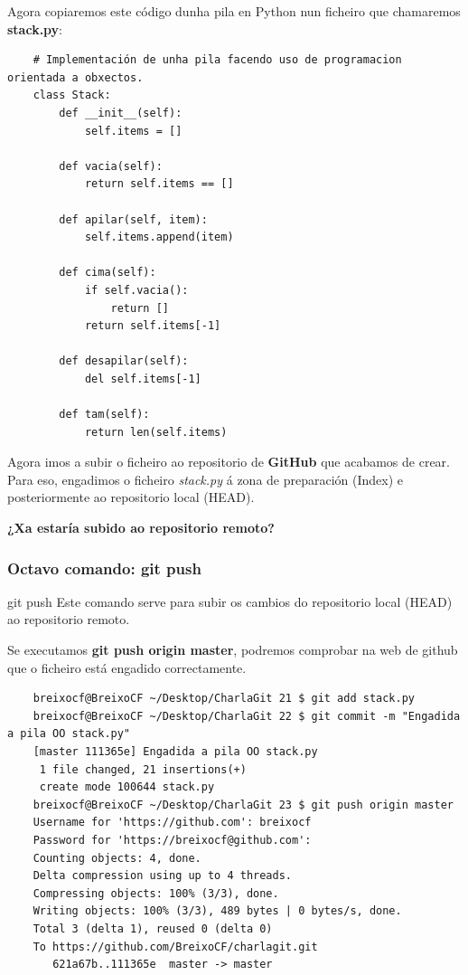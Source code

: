 \begin{frame}[fragile]
	\scriptsize
	Agora copiaremos este código dunha pila en Python nun ficheiro que chamaremos \textbf{stack.py}:
	\tiny
	\begin{verbatim}
	# Implementación de unha pila facendo uso de programacion orientada a obxectos.
	class Stack:
	    def __init__(self):
	        self.items = []
	
	    def vacia(self):
	        return self.items == []
	
	    def apilar(self, item):
	        self.items.append(item)
	
	    def cima(self):
	        if self.vacia():
	            return []
	        return self.items[-1]
	
	    def desapilar(self):
	        del self.items[-1]
	
	    def tam(self):
	        return len(self.items)
	\end{verbatim}
\end{frame}

\begin{frame}
	\normalsize
	Agora imos a subir o ficheiro ao repositorio de \textbf{GitHub} que acabamos de crear. Para eso, engadimos o ficheiro \textit{stack.py} á zona de preparación (Index) e posteriormente ao repositorio local (HEAD).\\
	\vspace{2cm}
	\large
	\begin{center}
	\textbf{¿Xa estaría subido ao repositorio remoto?}
	\end{center}
\end{frame}

\begin{frame}[fragile]
	\frametitle{Octavo comando: git push}
	\begin{block}{git push}
		Este comando serve para subir os cambios do repositorio local (HEAD) ao repositorio remoto.
	\end{block}
	\scriptsize
	Se executamos \textbf{git push origin master}, podremos comprobar na web de github que o ficheiro está engadido correctamente.
	\tiny 
	\begin{verbatim}
	breixocf@BreixoCF ~/Desktop/CharlaGit 21 $ git add stack.py 
	breixocf@BreixoCF ~/Desktop/CharlaGit 22 $ git commit -m "Engadida a pila OO stack.py"
	[master 111365e] Engadida a pila OO stack.py
	 1 file changed, 21 insertions(+)
	 create mode 100644 stack.py
	breixocf@BreixoCF ~/Desktop/CharlaGit 23 $ git push origin master 
	Username for 'https://github.com': breixocf
	Password for 'https://breixocf@github.com': 
	Counting objects: 4, done.
	Delta compression using up to 4 threads.
	Compressing objects: 100% (3/3), done.
	Writing objects: 100% (3/3), 489 bytes | 0 bytes/s, done.
	Total 3 (delta 1), reused 0 (delta 0)
	To https://github.com/BreixoCF/charlagit.git
	   621a67b..111365e  master -> master
	\end{verbatim}
\end{frame}

